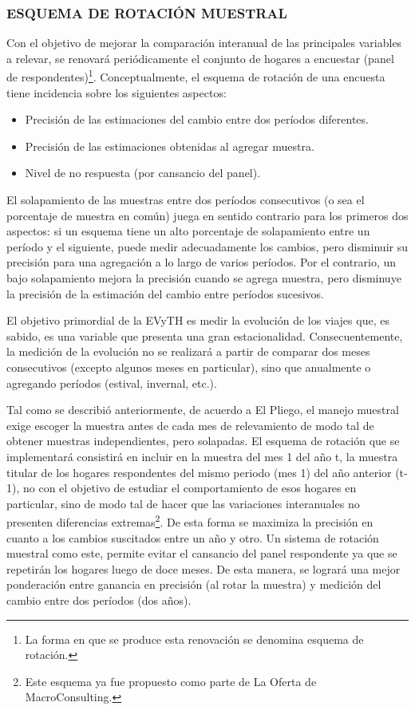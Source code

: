 \documentclass[
  openany]{book}
\begin{document}
\hypertarget{esquema-de-rotaciuxf3n-muestral}{%
\subsubsection{\texorpdfstring{\textbf{ESQUEMA DE ROTACIÓN MUESTRAL}}{ESQUEMA DE ROTACIÓN MUESTRAL}}\label{esquema-de-rotaciuxf3n-muestral}}

Con el objetivo de mejorar la comparación interanual de las principales variables a relevar, se renovará periódicamente el conjunto de hogares a encuestar (panel de respondentes)\footnote{La forma en que se produce esta renovación se denomina esquema de rotación.}.
Conceptualmente, el esquema de rotación de una encuesta tiene incidencia sobre los siguientes aspectos:

\begin{itemize}
\item
  Precisión de las estimaciones del cambio entre dos períodos diferentes.
\item
  Precisión de las estimaciones obtenidas al agregar muestra.
\item
  Nivel de no respuesta (por cansancio del panel).
\end{itemize}

El solapamiento de las muestras entre dos períodos consecutivos (o sea el porcentaje de muestra en común) juega en sentido contrario para los primeros dos aspectos: si un esquema tiene un alto porcentaje de solapamiento entre un período y el siguiente, puede medir adecuadamente los cambios, pero disminuir su precisión para una agregación a lo largo de varios períodos.
Por el contrario, un bajo solapamiento mejora la precisión cuando se agrega muestra, pero disminuye la precisión de la estimación del cambio entre períodos sucesivos.

El objetivo primordial de la EVyTH es medir la evolución de los viajes que, es sabido, es una variable que presenta una gran estacionalidad.
Consecuentemente, la medición de la evolución no se realizará a partir de comparar dos meses consecutivos (excepto algunos meses en particular), sino que anualmente o agregando períodos (estival, invernal, etc.).

Tal como se describió anteriormente, de acuerdo a El Pliego, el manejo muestral exige escoger la muestra antes de cada mes de relevamiento de modo tal de obtener muestras independientes, pero solapadas.
El esquema de rotación que se implementará consistirá en incluir en la muestra del mes 1 del año t, la muestra titular de los hogares respondentes del mismo periodo (mes 1) del año anterior (t-1), no con el objetivo de estudiar el comportamiento de esos hogares en particular, sino de modo tal de hacer que las variaciones interanuales no presenten diferencias extremas\footnote{Este esquema ya fue propuesto como parte de La Oferta de MacroConsulting.}.
De esta forma se maximiza la precisión en cuanto a los cambios suscitados entre un año y otro.
Un sistema de rotación muestral como este, permite evitar el cansancio del panel respondente ya que se repetirán los hogares luego de doce meses.
De esta manera, se logrará una mejor ponderación entre ganancia en precisión (al rotar la muestra) y medición del cambio entre dos períodos (dos años).
\end{document}
